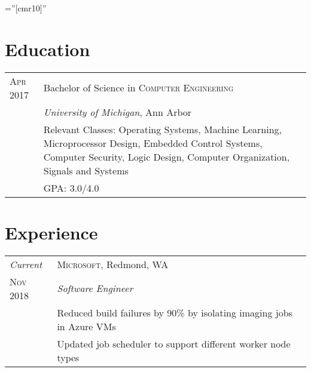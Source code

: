 \documentclass[a4paper,12pt]{article} %
\begin{document}
\pagestyle{empty} %

\font\fb=''[cmr10]'' %


\par{\par}
\par{\par}


\section{Education}

\begin{tabular}{R{2.1cm}|p{15.5cm}}
\hspace{4pt}\textsc{Apr} 2017 & Bachelor of Science in
 \textsc{Computer Engineering} \\
& \normalsize\emph{University of Michigan}, Ann Arbor \\
& \footnotesize{Relevant Classes: Operating Systems, Machine Learning,
  Microprocessor Design, Embedded Control Systems, Computer Security,
  Logic Design, Computer Organization, Signals and Systems}\\
& \footnotesize{GPA: 3.0/4.0} \\
\end{tabular}


\section{Experience}

\begin{tabular}{R{2.1cm}|p{15.5cm}}
\emph{Current} & \textsc{Microsoft}, Redmond, WA \\
\textsc{Nov 2018} & \emph{Software Engineer} \\
& \footnotesize{Reduced build failures by 90\% by isolating imaging jobs in
  Azure VMs} \\
& \footnotesize{Updated job scheduler to support different worker node types} \\
\end{tabular}
\end{document}
